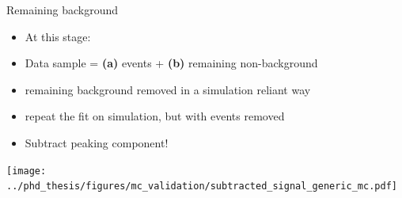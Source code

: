 \documentclass[xcolor=dvipsnames]{beamer}
\begin{document}
\begin{frame}{Remaining background}
\scriptsize\centering
   \begin{itemize}
      \item At this stage:
      \item Data sample = \textbf{(a)} \BtoXsgamma events + \textbf{(b)} remaining non-\BtoXsgamma background
      \item[\ra] remaining background removed in a simulation reliant way
      \item[\ra] repeat the fit on simulation, but with \BtoXsgamma events removed
      \item[\ra] Subtract peaking component!  
   \end{itemize}


   \texttt{[image: ../phd\_thesis/figures/mc\_validation/subtracted\_signal\_generic\_mc.pdf]}
\end{frame}
\end{document}
